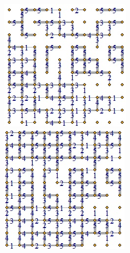 \begin{figure}[t]
    \centering
    \begin{minipage}{0.45\textwidth}
        \centering
        \includegraphics[width=\textwidth]{images/villagesEvol1.jpg}
        \caption{} %
        \label{fig:sub1}
    \end{minipage}\hfill
    \begin{minipage}{0.45\textwidth} %
        \centering
        \includegraphics[width=\textwidth]{images/villagesEvol2.jpg}
        \caption{} %
        \label{fig:sub2}
    \end{minipage}
    

\end{figure}
